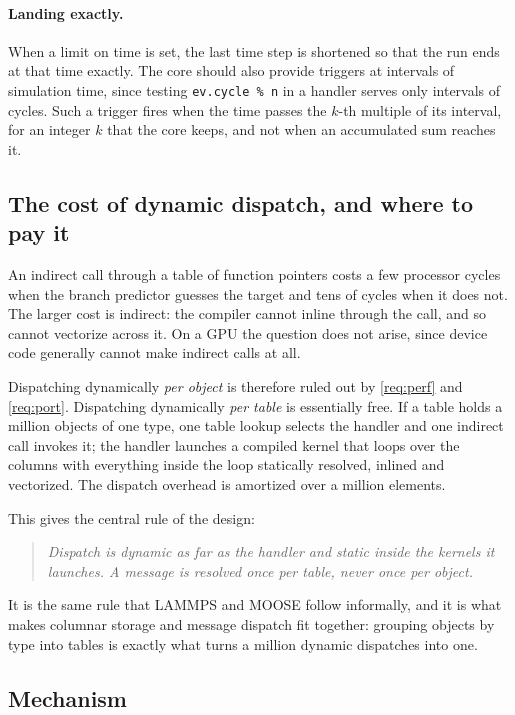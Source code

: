 \documentclass[11pt,a4paper]{article}
\newcommand{\code}[1]{\texttt{#1}}
\begin{document}
\paragraph{Landing exactly.}  When a limit on time is set, the last time
step is shortened so that the run ends at that time exactly.  The core
should also provide triggers at intervals of simulation time, since testing
\code{ev.cycle \% n} in a handler serves only intervals of cycles.  Such a
trigger fires when the time passes the $k$-th multiple of its interval, for
an integer $k$ that the core keeps, and not when an accumulated sum reaches
it.

\subsection{The cost of dynamic dispatch, and where to pay it}

An indirect call through a table of function pointers costs a few processor
cycles when the branch predictor guesses the target and tens of cycles when it
does not.  The larger cost is indirect: the compiler cannot inline through
the call, and so cannot vectorize across it.  On a GPU the question does not
arise, since device code generally cannot make indirect calls at all.

Dispatching dynamically \emph{per object} is therefore ruled out by
\ref{req:perf} and \ref{req:port}.  Dispatching dynamically \emph{per table}
is essentially free.  If a table holds a million objects of one type, one
table lookup selects the handler and one indirect call invokes it; the handler
launches a compiled kernel that loops over the columns with everything inside the
loop statically resolved, inlined and vectorized.  The dispatch overhead is
amortized over a million elements.

This gives the central rule of the design:

\begin{quote}
\emph{Dispatch is dynamic as far as the handler and static inside the kernels
it launches.  A message is resolved once per table, never once per object.}
\end{quote}

It is the same rule that LAMMPS and MOOSE follow informally, and it is what
makes columnar storage and message dispatch fit together: grouping objects by
type into tables is exactly what turns a million dynamic dispatches into one.

\subsection{Mechanism}
\label{sec:mechanism}
\end{document}

